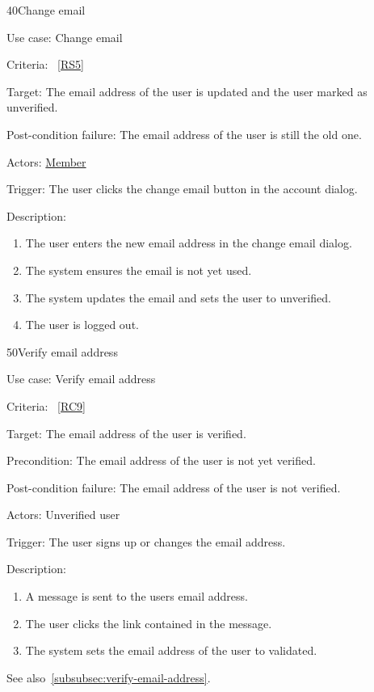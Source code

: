 \vspace{2.0em}

\begin{function}{40}{Change email}
	\item[Use case:] Change email
	\item[Criteria:]~\ref{RS5}
	\item[Target:] The email address of the user is updated and the user marked as unverified.
	\item[Post-condition failure:] The email address of the user is still the old one.
	\item[Actors:] \hyperref[def:member]{Member}
	\item[Trigger:] The user clicks the change email button in the account dialog.
	\item[Description:] ~
	\begin{enumerate}
		\item The user enters the new email address in the change email dialog.
		\item The system ensures the email is not yet used.
		\item The system updates the email and sets the user to unverified.
		\item The user is logged out.
	\end{enumerate}
\end{function}

\vspace{2.0em}

\begin{function}{50}{Verify email address}
	\item[Use case:] Verify email address
	\item[Criteria:]~\ref{RC9}
	\item[Target:] The email address of the user is verified.
	\item[Precondition:] The email address of the user is not yet verified.
	\item[Post-condition failure:] The email address of the user is not verified.
	\item[Actors:] Unverified user
	\item[Trigger:] The user signs up or changes the email address.
	\item[Description:] ~
	\begin{enumerate}
		\item A message is sent to the users email address.
		\item The user clicks the link contained in the message.
		\item The system sets the email address of the user to validated.
	\end{enumerate}
	See also~\ref{subsubsec:verify-email-address}.
\end{function}


